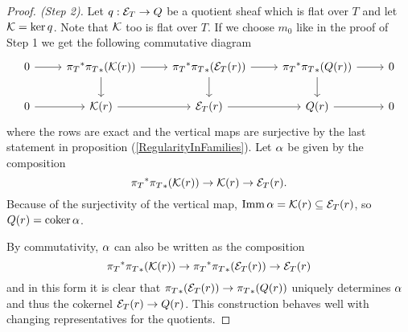 \begin{proof}[Proof. (Step 2)]
Let $q:\mathcal{E}_T\to Q$ be a quotient sheaf which is flat over $T$ and let $\mathcal{K}=\ker q$. Note that $\mathcal{K}$ too is flat over $T$. If we choose $m_0$ like in the proof of Step 1 we get the following commutative diagram
\[\begin{tikzcd}
	0 & {{\pi_T}^\ast{\pi_T}_\ast(\Kc(r))} & {{\pi_T}^\ast{\pi_T}_\ast(\Ec_T(r))} & {{\pi_T}^\ast{\pi_T}_\ast(Q(r))} & 0 \\
	0 & {\Kc(r)} & {\Ec_T(r)} & {Q(r)} & 0
	\arrow[from=1-1, to=1-2]
	\arrow[from=1-2, to=1-3]
	\arrow[from=1-2, to=2-2]
	\arrow[from=1-3, to=1-4]
	\arrow[from=1-3, to=2-3]
	\arrow[from=1-4, to=1-5]
	\arrow[from=1-4, to=2-4]
	\arrow[from=2-1, to=2-2]
	\arrow[from=2-2, to=2-3]
	\arrow[from=2-3, to=2-4]
	\arrow[from=2-4, to=2-5]
\end{tikzcd}\]
where the rows are exact and the vertical maps are surjective by the last statement in proposition (\ref{RegularityInFamilies}). Let $\alpha$ be given by the composition 
\[{\pi_T}^\ast{\pi_T}_\ast(\mathcal{K}(r))\to \mathcal{K}(r)\to \mathcal{E}_T(r).\]
Because of the surjectivity of the vertical map, $\mathrm{Imm}\,\alpha=\mathcal{K}(r)\subseteq \mathcal{E}_T(r)$, so $Q(r)=\mathrm{coker}\,\alpha$.

By commutativity, $\alpha$ can also be written as the composition
\[{\pi_T}^\ast{\pi_T}_\ast(\mathcal{K}(r))\to {\pi_T}^\ast{\pi_T}_\ast(\mathcal{E}_T(r))\to \mathcal{E}_T(r)\] 
and in this form it is clear that ${\pi_T}_\ast(\mathcal{E}_T(r))\to {\pi_T}_\ast(Q(r))$ uniquely determines $\alpha$ and thus the cokernel $\mathcal{E}_T(r)\to Q(r)$. This construction behaves well with changing representatives for the quotients.
\end{proof}


